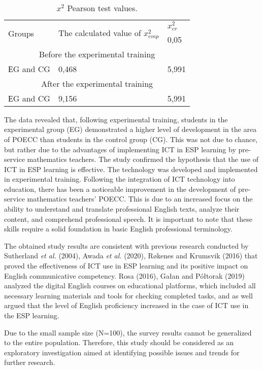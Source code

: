 \begin{table}[!htpb]
\centering
\begin{threeparttable}
\caption{$x^{2}$ Pearson test values.}
\label{tab-06}
\begin{tabular}{lll}
\toprule
\multirow{2}{*}{Groups} & \multicolumn{1}{p{3cm}}{\multirow{2}{=}{The calculated value of $x_{emp}^{2} $}} & $x_{cr}^{2} $ \\ 
 & & 0,05 \\
\midrule
\multicolumn{3}{c}{Before the experimental training} \\ 
ЕG and CG & 0,468 & 5,991 \\[0.3cm]
\multicolumn{3}{c}{After the experimental training} \\ 
ЕG and CG & 9,156 & 5,991 \\
\bottomrule
\end{tabular}
\end{threeparttable}
\end{table}
	
The data revealed that, following experimental training, students in the
experimental group (EG) demonstrated a higher level of development in
the area of POECC than students in the control group (CG). This was not
due to chance, but rather due to the advantages of implementing ICT in
ESP learning by pre-service mathematics teachers. The study confirmed
the hypothesis that the use of ICT in ESP learning is effective. The
technology was developed and implemented in experimental training.
Following the integration of ICT technology into education, there has
been a noticeable improvement in the development of pre-service
mathematics teachers' POECC. This is due to an
increased focus on the ability to understand and translate professional
English texts, analyze their content, and comprehend professional
speech. It is important to note that these skills require a solid
foundation in basic English professional terminology.

The obtained study results are consistent with previous research
conducted by Sutherland \emph{et al.} (2004), Awada \emph{et al.}
(2020), Røkenes and Krumsvik (2016) that proved the effectiveness of ICT
use in ESP learning and its positive impact on English communicative
competency. Rosa (2016), Gałan and Półtorak (2019) analyzed the digital
English courses on educational platforms, which included all necessary
learning materials and tools for checking completed tasks, and as well
argued that the level of English proficiency increased in the case of
ICT use in the ESP learning.


Due to the small sample size (N=100), the survey results cannot be
generalized to the entire population. Therefore, this study should be
considered as an exploratory investigation aimed at identifying possible
issues and trends for further research.

	
